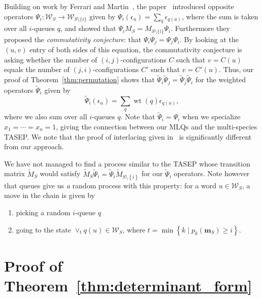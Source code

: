 \documentclass[reqno]{amsart}
\newcommand{\0}{\phantom{c}}
\newcommand{\merge}[1]{\vee_{#1}} %
\DeclareMathOperator{\wt}{wt} %
\newcommand{\mm}{\mathbf{m}}
\newcommand{\mcW}{\mathcal{W}}
\let\sumnonlimits\sum
\renewcommand{\sum}{\sumnonlimits\limits}
\newcommand{\set}[1]{\left\{ #1 \right\}}
\newcommand{\defn}[1]{{\color{darkred}\emph{#1}}} %
\theoremstyle{plain}
\theoremstyle{definition}
\numberwithin{equation}{section}
\begin{document}
Building on work by Ferrari and Martin~\cite{FM06,FM07}, the paper~\cite{AAMP} introduced opposite operators $\Psi_i \colon \mcW_S \to \mcW_{S \setminus \{i\}}$ given by $\Psi_i(\epsilon_u) = \sum_{q} \epsilon_{q(u)}$, where the sum is taken over all $i$-queues $q$, and showed that $\Psi_i M_S = M_{S \setminus \{i\}} \Psi_i$.
Furthermore they proposed the \defn{commutativity conjecture}: that $\Psi_i \Psi_j = \Psi_j \Psi_i$.
By looking at the $(u,v)$ entry of both sides of this equation, the commutativity conjecture is asking whether the number of $(i,j)$-configurations $C$ such that $v = C(u)$ equals the number of $(j,i)$-configurations $C'$ such that $v = C'(u)$. 
Thus, our proof of Theorem~\ref{thm:permutation} shows that $\widetilde{\Psi}_i \widetilde{\Psi}_j = \widetilde{\Psi}_j \widetilde{\Psi}_i$ for the weighted operators $\widetilde{\Psi}_i$ given by
\[
\widetilde{\Psi}_i(\epsilon_u) = \sum_q \wt(q) \epsilon_{q(u)},
\]
where we also sum over all $i$-queues $q$.
Note that $\widetilde{\Psi}_i = \Psi_i$ when we specialize $x_1 = \cdots = x_n = 1$, giving the connection between our MLQs and the multi-species TASEP.
We note that the proof of interlacing given in~\cite{AAMP} is significantly different from our approach.

We have not managed to find a process similar to the TASEP whose transition matrix $\widetilde{M}_S$ would satisfy $\widetilde{M}_S \widetilde{\Psi}_i = \widetilde{\Psi}_i \widetilde{M}_{S \setminus \set{i}}$ for our $\widetilde{\Psi}_i$ operators.
Note however that queues give us \emph{a} random process with this property: for a word $u \in \mcW_S$, a move in the chain is given by
\begin{enumerate}
\item picking a random $i$-queue $q$
\item going to the state $\merge{t} q(u) \in \mcW_S$, where $t = \min\set{k \mid p_k(\mm_S) \geq i}$.
\end{enumerate}











\section{Proof of Theorem~\ref{thm:determinant_form}}
\label{sec:JT-proofs}
\end{document}
